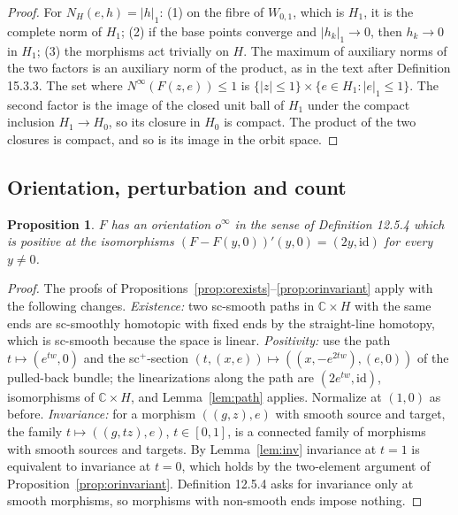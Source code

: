 \documentclass[11pt,a4paper]{article}
\theoremstyle{plain}
\newtheorem{proposition}[theorem]{Proposition}
\theoremstyle{definition}
\theoremstyle{remark}
\newcommand{\C}{\mathbb{C}}
\newcommand{\abs}[1]{\lvert #1\rvert}
\newcommand{\id}{\mathrm{id}}
\begin{document}
\begin{proof}
For $N_H(e,h)=\abs h_1$: (1) on the fibre of $W_{0,1}$, which is $H_1$, it is the complete norm of $H_1$;
(2) if the base points converge and $\abs{h_k}_1\to0$, then $h_k\to0$ in $H_1$; (3) the morphisms act
trivially on $H$. The maximum of auxiliary norms of the two factors is an auxiliary norm of the product,
as in the text after Definition 15.3.3. The set where $N^\infty(F(z,e))\le1$ is
$\{\abs z\le1\}\times\{e\in H_1:\abs e_1\le1\}$. The second factor is the image of the closed unit ball of
$H_1$ under the compact inclusion $H_1\to H_0$, so its closure in $H_0$ is compact. The product of the
two closures is compact, and so is its image in the orbit space.
\end{proof}

\subsection{Orientation, perturbation and count}

\begin{proposition}\label{prop:inforientation}
$F$ has an orientation $o^\infty$ in the sense of Definition 12.5.4 which is positive at the
isomorphisms $(F-F(y,0))'(y,0)=(2y,\id)$ for every $y\neq0$.
\end{proposition}

\begin{proof}
The proofs of Propositions~\ref{prop:orexists}--\ref{prop:orinvariant} apply with the following
changes. \emph{Existence:} two sc-smooth paths in $\C\times H$ with the same ends are sc-smoothly
homotopic with fixed ends by the straight-line homotopy, which is sc-smooth because the space is linear.
\emph{Positivity:} use the path $t\mapsto(e^{tw},0)$ and the sc$^+$-section
$(t,(x,e))\mapsto((x,-e^{2tw}),(e,0))$ of the pulled-back bundle; the linearizations along the path are
$(2e^{tw},\id)$, isomorphisms of $\C\times H$, and Lemma~\ref{lem:path} applies. Normalize at $(1,0)$
as before. \emph{Invariance:} for a morphism $((g,z),e)$ with smooth source and target, the family
$t\mapsto((g,tz),e)$, $t\in[0,1]$, is a connected family of morphisms with smooth sources and targets.
By Lemma~\ref{lem:inv} invariance at $t=1$ is equivalent to invariance at $t=0$, which holds by the
two-element argument of Proposition~\ref{prop:orinvariant}. Definition 12.5.4 asks for invariance only
at smooth morphisms, so morphisms with non-smooth ends impose nothing.
\end{proof}
\end{document}
